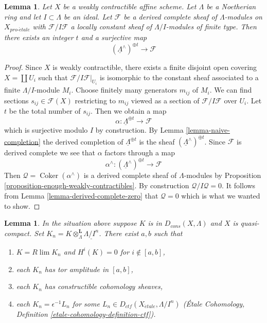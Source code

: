 \documentclass[10pt,a4paper]{amsart}
\theoremstyle{plain}
\newtheorem{lemma}[subsection]{Lemma}
\theoremstyle{definition}
\theoremstyle{remark}
\numberwithin{equation}{subsection}
\def\lim{\mathop{\mathrm{lim}}\nolimits}
\def\proetale{{pro\text{-}\acute{e}tale}}
\def\etale{{\acute{e}tale}}
\def\Coker{\mathop{\mathrm{Coker}}}
\begin{document}
\begin{lemma}
\label{lemma-derived-complete-limit}
Let $X$ be a weakly contractible affine scheme.
Let $\Lambda$ be a Noetherian ring and let $I \subset \Lambda$ be an ideal.
Let $\mathcal{F}$ be a derived complete sheaf of $\Lambda$-modules
on $X_\proetale$ with $\mathcal{F}/I\mathcal{F}$ a locally
constant sheaf of $\Lambda/I$-modules of finite type.
Then there exists an integer $t$ and a surjective map
$$
(\underline{\Lambda}^\wedge)^{\oplus t} \to \mathcal{F}
$$
\end{lemma}

\begin{proof}
Since $X$ is weakly contractible, there exists a finite disjoint open
covering $X = \coprod U_i$ such that $\mathcal{F}/I\mathcal{F}|_{U_i}$
is isomorphic to the constant sheaf associated to a finite $\Lambda/I$-module
$M_i$. Choose finitely many generators $m_{ij}$ of $M_i$. We
can find sections $s_{ij} \in \mathcal{F}(X)$ restricting to
$m_{ij}$ viewed as a section of $\mathcal{F}/I\mathcal{F}$ over $U_i$. 
Let $t$ be the total number of $s_{ij}$. Then we obtain a map
$$
\alpha : \underline{\Lambda}^{\oplus t} \longrightarrow \mathcal{F}
$$
which is surjective modulo $I$ by construction. By
Lemma \ref{lemma-naive-completion}
the derived completion of $\underline{\Lambda}^{\oplus t}$ is the
sheaf $(\underline{\Lambda}^\wedge)^{\oplus t}$. Since $\mathcal{F}$
is derived complete we see that $\alpha$ factors through a map
$$
\alpha^\wedge :
(\underline{\Lambda}^\wedge)^{\oplus t}
\longrightarrow
\mathcal{F}
$$
Then $\mathcal{Q} = \Coker(\alpha^\wedge)$ is a derived complete
sheaf of $\Lambda$-modules by
Proposition \ref{proposition-enough-weakly-contractibles}.
By construction $\mathcal{Q}/I\mathcal{Q} = 0$. It follows from
Lemma \ref{lemma-derived-complete-zero}
that $\mathcal{Q} = 0$ which is what we wanted to show.
\end{proof}

\begin{lemma}
\label{lemma-describe-constructible-complexes}
In the situation above suppose $K$ is in $D_{cons}(X, \Lambda)$
and $X$ is quasi-compact. Set
$K_n = K \otimes_\Lambda^\mathbf{L} \underline{\Lambda/I^n}$.
There exist $a, b$ such that
\begin{enumerate}
\item $K = R\lim K_n$ and $H^i(K) = 0$ for $i \not \in [a, b]$,
\item each $K_n$ has tor amplitude in $[a, b]$,
\item each $K_n$ has constructible cohomology sheaves,
\item each $K_n = \epsilon^{-1}L_n$ for some
$L_n \in D_{ctf}(X_\etale, \Lambda/I^n)$
(\'Etale Cohomology, Definition \ref{etale-cohomology-definition-ctf}).
\end{enumerate}
\end{lemma}
\end{document}
